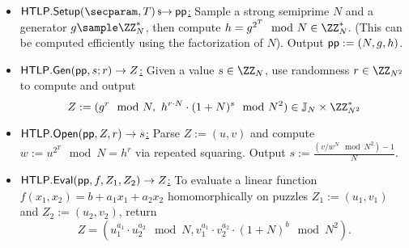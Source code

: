     \begin{construction}\label{con:paillierHTLP}
    \hfill
    \begin{itemize}
        \item \underline{$\htlp.\Setup(\secparam, \Ttime) \randout \pparam$:} Sample a strong semiprime $N$ and a generator $g \sample \ZZ_N^*$, then compute $h = g^{2^\Ttime} \mod{N} \in \ZZ_N^*$. (This can be computed efficiently using the factorization of $N$). Output $\mathsf{pp} := (N, g, h)$.
        \item \underline{$\mathsf{HTLP}.{\sf Gen}(\mathsf{pp}, s; r) \rightarrow Z$:} Given a value $s \in \ZZ_N$, use randomness $r \in \ZZ_{N^2}$ to compute and output
            $$Z := (g^r \mod{N},\ h^{r \cdot N} \cdot (1+N)^s \mod{N^2}) \in \JJ_N \times \ZZ_{N^2}^*$$
        \item \underline{$\mathsf{HTLP}.\mathsf{Open}(\mathsf{pp}, Z, r) \rightarrow s$:} Parse $Z := (u,v)$ and compute $w := u^{2^T} \mod{N} \allowbreak= h^r$ via repeated squaring. Output $s := \frac{(v/w^N \mod{N^2})- 1}{N}$.
        \item \underline{$\mathsf{HTLP}.{\sf Eval}(\mathsf{pp}, f, Z_1, Z_2) \rightarrow Z$:} To evaluate a linear function $f(x_1, x_2) = b + a_1 x_1 + a_2 x_2$ homomorphically on puzzles $Z_1 := (u_1, v_1)$ and $Z_2 := (u_2, v_2)$, return
        $$Z = (u_1^{a_1} \cdot u_2^{a_2} \mod{N}, v_1^{a_1} \cdot v_2^{a_2} \cdot (1+N)^b \mod{N^2}).$$
    \end{itemize}
    \end{construction}


